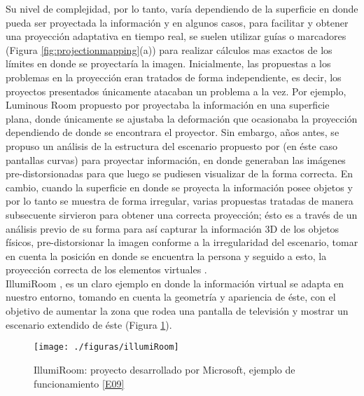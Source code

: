 \documentclass[a4paper,openright,12pt]{report}
\begin{document}
Su nivel de complejidad, por lo tanto, varía dependiendo de la superficie en donde pueda ser proyectada la información y en algunos casos, para facilitar y obtener una proyección adaptativa en tiempo real, se suelen utilizar guías o marcadores (Figura \ref{fig:projectionmapping}(a)) para realizar cálculos mas exactos de los límites en donde se proyectaría la imagen. Inicialmente, las propuestas a los problemas en la proyección eran tratados de forma independiente, es decir, los proyectos presentados únicamente atacaban un problema a la vez. Por ejemplo, Luminous Room propuesto por \citep{Under1997} proyectaba la información en una superficie plana, donde únicamente se ajustaba la deformación que ocasionaba la proyección dependiendo de donde se encontrara el proyector. Sin embargo, años antes, se propuso un análisis de la estructura del escenario propuesto por \citep{Dorsey1991} (en éste caso pantallas curvas) para proyectar información, en donde generaban las imágenes pre-distorsionadas para que luego se pudiesen visualizar de la forma correcta. En cambio, cuando la superficie en donde se proyecta la información posee objetos y por lo tanto se muestra de forma irregular, varias propuestas tratadas de manera subsecuente sirvieron para obtener una correcta proyección; ésto es a través de un análisis previo de su forma para así capturar la información 3D de los objetos físicos, pre-distorsionar la imagen conforme a la irregularidad del escenario, tomar en cuenta la posición en donde se encuentra la persona y seguido a esto, la proyección correcta de los elementos virtuales \citep{Raskar1998b,Raskar2001,Starner2003,Wilson2007}.\\
IllumiRoom \citep{jones2013}, es un claro ejemplo en donde la información virtual se adapta en nuestro entorno, tomando en cuenta la geometría y apariencia de éste, con el objetivo de aumentar la zona que rodea una pantalla de televisión y mostrar un escenario extendido de éste (Figura \ref{fig:illumiRoom}).
\begin{figure}[thb]
	\centering
	\texttt{[image: ./figuras/illumiRoom]}
	\caption[Proyecto IllumiRoom por Microsoft\textregistered]{IllumiRoom: proyecto desarrollado por Microsoft\textregistered, ejemplo de funcionamiento \hyperlink{e09}{[E09]} } \label{fig:illumiRoom}
\end{figure}
\end{document}
